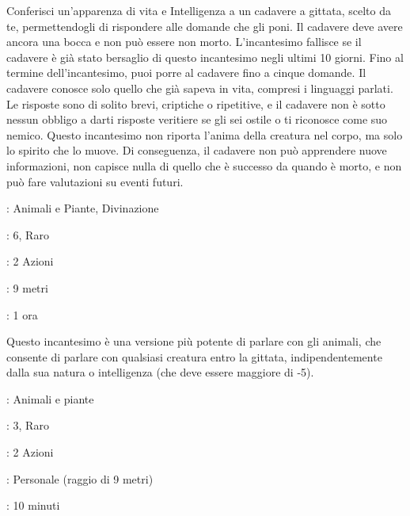\begin{multicols}{2}
Conferisci un'apparenza di vita e Intelligenza a un cadavere a gittata, scelto da te, permettendogli di rispondere alle domande che gli poni. Il cadavere deve avere ancora una bocca e non può essere non morto. L'incantesimo fallisce se il cadavere è già stato bersaglio di questo incantesimo negli ultimi 10 giorni. Fino al termine dell'incantesimo, puoi porre al cadavere fino a cinque domande. Il cadavere conosce solo quello che già sapeva in vita, compresi i linguaggi parlati. Le risposte sono di solito brevi, criptiche o ripetitive, e il cadavere non è sotto nessun obbligo a darti risposte veritiere se gli sei ostile o ti riconosce come suo nemico. Questo incantesimo non riporta l'anima della creatura nel corpo, ma solo lo spirito che lo muove. Di conseguenza, il cadavere non può apprendere nuove informazioni, non capisce nulla di quello che è successo da quando è morto, e non può fare valutazioni su eventi futuri.

\noindent\colorbox{OBSSgold!10}{
\begin{minipage}{0.95\linewidth}
\begin{description}[noitemsep, topsep=0pt, parsep=0pt, partopsep=0pt, leftmargin=0cm, labelwidth=1.3cm]
	\item[\textbf{Lista}]: Animali e Piante, Divinazione
	\item[\textbf{Livello}]: 6, Raro
	\item[\textbf{Lancio}]: 2 Azioni
	\item[\textbf{Gittata}]: 9 metri
	\item[\textbf{Durata}]: 1 ora
\end{description}
\end{minipage}}\smallskip

Questo incantesimo è una versione più potente di parlare con gli animali, che consente di parlare con qualsiasi creatura entro la gittata, indipendentemente dalla sua natura o intelligenza (che deve essere maggiore di -5).

\noindent\colorbox{OBSSgold!10}{
\begin{minipage}{0.95\linewidth}
\begin{description}[noitemsep, topsep=0pt, parsep=0pt, partopsep=0pt, leftmargin=0cm, labelwidth=1.3cm]
	\item[\textbf{Lista}]: Animali e piante
	\item[\textbf{Livello}]: 3, Raro
	\item[\textbf{Lancio}]: 2 Azioni
	\item[\textbf{Gittata}]: Personale (raggio di 9 metri)
	\item[\textbf{Durata}]: 10 minuti
\end{description}
\end{minipage}}\smallskip


\end{multicols}
